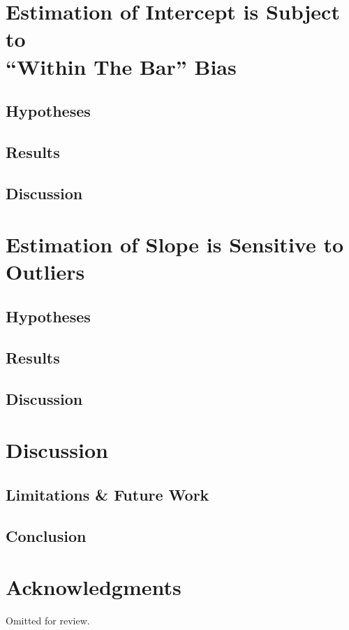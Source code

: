 \documentclass{sigchi}
\begin{document}
\section{Estimation of Intercept is Subject to \\ ``Within The Bar'' Bias}
\subsection{Hypotheses}
\subsection{Results}
\subsection{Discussion}

\section{Estimation of Slope is Sensitive to Outliers}
\subsection{Hypotheses}
\subsection{Results}
\subsection{Discussion}

\section{Discussion}
\subsection{Limitations \& Future Work}
\subsection{Conclusion}
\section{Acknowledgments}

Omitted for review.

%
%
%
%
%
\balance{}




\end{document}
